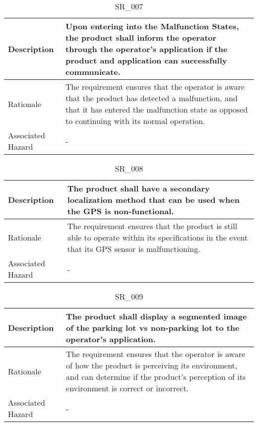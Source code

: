 \documentclass{article}
\begin{document}
\begin{table}[!h]
\begin{center}
\caption {SR\_007} 
\label{SR_007}
\begin{tabular}{ | m{3cm} | m{11cm} | }
\hline
Description & Upon entering into the Malfunction States, the product shall inform the operator through the operator's application if the product and application can successfully communicate. \\
\hline
Rationale & The requirement ensures that the operator is aware that the product has detected a malfunction, and that it has entered the malfunction state as opposed to continuing with its normal operation. \\
\hline
Associated Hazard & - \\
\hline
\end{tabular}
\end{center}
\end{table}

\begin{table}[!h]
\begin{center}
\caption {SR\_008} 
\label{SR_008}
\begin{tabular}{ | m{3cm} | m{11cm} | }
\hline
Description & The product shall have a secondary localization method that can be used when the GPS is non-functional. \\
\hline
Rationale & The requirement ensures that the product is still able to operate within its specifications in the event that its GPS sensor is malfunctioning. \\
\hline
Associated Hazard & - \\
\hline
\end{tabular}
\end{center}
\end{table}

\begin{table}[!h]
\begin{center}
\caption {SR\_009} 
\label{SR_009}
\begin{tabular}{ | m{3cm} | m{11cm} | }
\hline
Description & The product shall display a segmented image of the parking lot vs non-parking lot to the operator's application. \\
\hline
Rationale & The requirement ensures that the operator is aware of how the product is perceiving its environment, and can determine if the product's perception of its environment is correct or incorrect. \\
\hline
Associated Hazard & - \\
\hline
\end{tabular}
\end{center}
\end{table}
\end{document}

